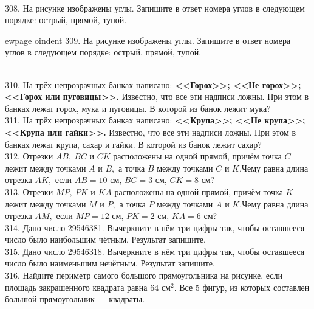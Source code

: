\begin{figure}[ht!]
\end{figure}\\
308. На рисунке изображены углы. Запишите в ответ номера углов в следующем порядке: острый, прямой, тупой.\\
\begin{figure}[ht!]
\end{figure}
ewpage
oindent
309. На рисунке изображены углы. Запишите в ответ номера углов в следующем порядке: острый, прямой, тупой.\\
\begin{figure}[ht!]
\end{figure}\\
310. На трёх непрозрачных банках написано: {\bf <<Горох>>; <<Не горох>>; <<Горох или пуговицы>>.} Известно, что все эти надписи ложны. При этом в банках лежат горох, мука и пуговицы. В которой из банок лежит мука?\\
311. На трёх непрозрачных банках написано: {\bf <<Крупа>>; <<Не крупа>>; <<Крупа или гайки>>.} Известно, что все эти надписи ложны. При этом в банках лежат крупа, сахар и гайки. В которой из банок лежит сахар?\\
312. Отрезки $AB,\ BC$ и $CK$ расположены на одной прямой, причём точка $C$ лежит между точками $A$ и $B,$ а точка $B$ между точками $C$ и $K.$Чему равна длина отрезка $AK,$ если $AB=10$ см, $BC=3$ см, $CK=8$ см?\\
313. Отрезки $MP,\ PK$ и $KA$ расположены на одной прямой, причём точка $K$ лежит между точками $M$ и $P,$ а точка $P$ между точками $A$ и $K.$Чему равна длина отрезка $AM,$ если $MP=12$ см, $PK=2$ см, $KA=6$ см?\\
314. Дано число 29546381. Вычеркните в нём три цифры так, чтобы оставшееся число было наибольшим чётным. Результат запишите.\\
315. Дано число 29546318. Вычеркните в нём три цифры так, чтобы оставшееся число было наименьшим нечётным. Результат запишите.\\
316. Найдите периметр самого большого прямоугольника на рисунке, если площадь закрашенного квадрата равна $64\text{ см}^2.$ Все 5 фигур, из которых составлен большой прямоугольник --- квадраты.\\
\begin{figure}[ht!]
\end{figure}\\
